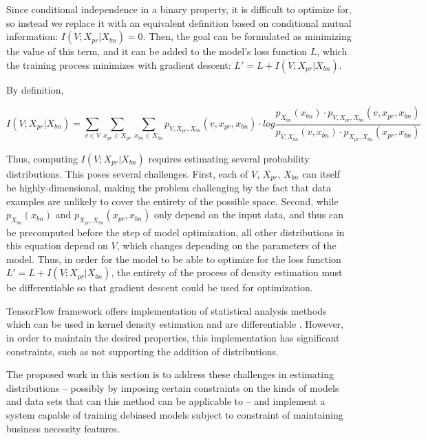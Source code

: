 Since conditional independence in a binary property, it is difficult to optimize
for, so instead we replace it with an equivalent definition based on conditional
mutual information: $I(V;X_{pr}|X_{bn}) = 0$. Then, the goal can be formulated
as minimizing the value of this term, and it can be added to the model’s loss
function $L$, which the training process minimizes with gradient descent:
$L' = L + I(V;X_{pr}|X_{bn})$.

By definition,

\begin{equation}
I(V;X_{pr}|X_{bn}) = \sum_{v \in V} \sum_{x_{pr} \in X_{pr}}
\sum_{x_{bn} \in X_{bn}} p_{V,X_{pr},X_{bn}}(v,x_{pr},x_{bn}) \cdot log
\frac{p_{X_{bn}}(x_{bn})\cdot p_{V,X_{pr},X_{bn}}(v,x_{pr},x_{bn})}
{p_{V,X_{bn}}(v,x_{bn}) \cdot p_{X_{pr},X_{bn}}(x_{pr},x_{bn})}
\end{equation}

Thus, computing $I(V;X_{pr}|X_{bn})$ requires estimating several probability
distributions. This poses several challenges. First, each of $V$, $X_{pr}$,
$X_{bn}$ can itself be highly-dimensional, making the problem challenging by
the fact that data examples are unlikely to cover the entirety of the possible
space. Second, while $p_{X_{bn}}(x_{bn})$ and $p_{X_{pr},X_{bn}}(x_{pr},x_{bn})$
only depend on the input data, and thus can be precomputed before the step of
model optimization, all other distributions in this equation depend on $V$,
which changes depending on the parameters of the model. Thus, in order for the
model to be able to optimize for the loss function $L' = L + I(V;X_{pr}|X_{bn})$,
the entirety of the process of density estimation must be differentiable so that
gradient descent could be used for optimization.

TensorFlow framework offers implementation of statistical analysis methods
which can be used in kernel density estimation and are differentiable
\cite{171110604}. However, in order to maintain the desired properties, this
implementation has significant constraints, such as not supporting the addition
of distributions.

The proposed work in this section is to address these challenges in estimating
distributions -- possibly by imposing certain constraints on the kinds of models
and data sets that can this method can be applicable to -- and implement a
system capable of training debiased models subject to constraint of maintaining
business necessity features.
